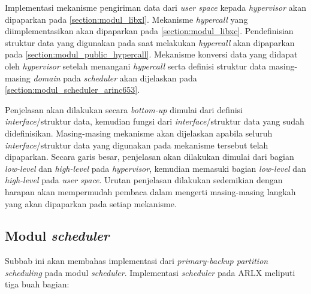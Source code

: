Implementasi mekanisme pengiriman data dari \textit{user space} kepada \textit{hypervisor} akan
dipaparkan pada \autoref{section:modul_libxl}. Mekanisme \textit{hypercall} yang
diimplementasikan akan dipaparkan pada \autoref{section:modul_libxc}. Pendefinisian struktur
data yang digunakan pada saat melakukan \textit{hypercall} akan dipaparkan pada
\autoref{section:modul_public_hypercall}. Mekanisme konversi data yang didapat oleh
\textit{hypervisor} setelah menangani \textit{hypercall} serta definisi struktur data
masing-masing \textit{domain} pada \textit{scheduler} akan dijelaskan pada
\autoref{section:modul_scheduler_arinc653}.

Penjelasan akan dilakukan secara \textit{bottom-up} dimulai dari definisi
\textit{interface}/struktur data, kemudian fungsi dari \textit{interface}/struktur data yang
sudah didefinisikan. Masing-masing mekanisme akan dijelaskan apabila seluruh
\textit{interface}/struktur data yang digunakan pada mekanisme tersebut telah dipaparkan. Secara
garis besar, penjelasan akan dilakukan dimulai dari bagian \textit{low-level} dan
\textit{high-level} pada \textit{hypervisor}, kemudian memasuki bagian \textit{low-level} dan
\textit{high-level} pada \textit{user space}. Urutan penjelasan dilakukan sedemikian dengan
harapan akan mempermudah pembaca dalam mengerti masing-masing langkah yang akan dipaparkan pada
setiap mekanisme.

\subsection{Modul \textit{scheduler}}
\label{section:modul_scheduler_arinc653}

Subbab ini akan membahas implementasi dari \textit{primary-backup partition scheduling} pada
modul \textit{scheduler}. Implementasi \textit{scheduler} pada ARLX meliputi tiga buah
bagian:

